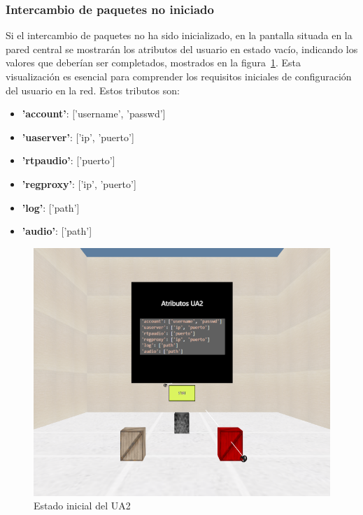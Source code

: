 \documentclass[a4paper, 12pt]{book}
\begin{document}
\subsubsection{Intercambio de paquetes no iniciado}
\label{subsubsec:Intercambio_NoIniciado}
Si el intercambio de paquetes no ha sido inicializado, en la pantalla situada en la pared central se mostrarán 
los atributos del usuario en estado vacío, indicando los valores que deberían ser completados, mostrados en la figura~\ref{fig:UA2_NoIniciado}. 
Esta visualización es esencial para comprender los requisitos iniciales de configuración del usuario en la red. Estos tributos son:

\begin{itemize}
  \item \textbf{'account'}: ['username', 'passwd']
  \item \textbf{'uaserver'}: ['ip', 'puerto']
  \item \textbf{'rtpaudio'}: ['puerto']
  \item \textbf{'regproxy'}: ['ip', 'puerto']
  \item \textbf{'log'}: ['path']
  \item \textbf{'audio'}: ['path']
\end{itemize}

\begin{figure}
  \centering
  \includegraphics[width=15cm, keepaspectratio]{img/resultados/UA2_NoIniciado.png}
  \caption{Estado inicial del UA2}
  \label{fig:UA2_NoIniciado}
\end{figure}
\end{document}
